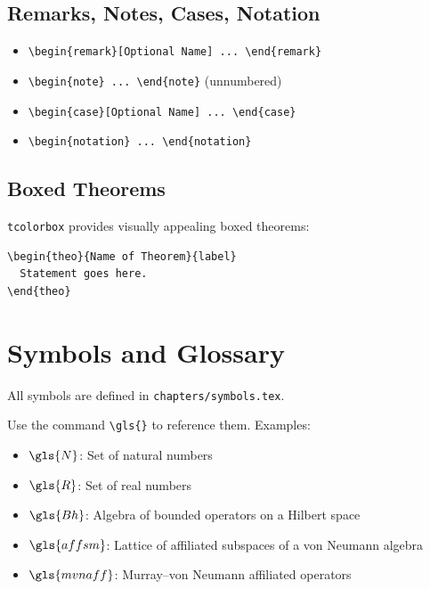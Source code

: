 \subsection*{Remarks, Notes, Cases, Notation}
\begin{itemize}
    \item \verb|\begin{remark}[Optional Name] ... \end{remark}|
    \item \verb|\begin{note} ... \end{note}| (unnumbered)
    \item \verb|\begin{case}[Optional Name] ... \end{case}|
    \item \verb|\begin{notation} ... \end{notation}|
\end{itemize}

\subsection*{Boxed Theorems}
\verb|tcolorbox| provides visually appealing boxed theorems:
\begin{verbatim}
\begin{theo}{Name of Theorem}{label}
  Statement goes here.
\end{theo}
\end{verbatim}

\section{Symbols and Glossary}
All symbols are defined in \verb|chapters/symbols.tex|.  

Use the command \verb|\gls{}| to reference them. Examples:

\begin{itemize}
    \item $\gls{N}$: Set of natural numbers  
    \item $\gls{R}$: Set of real numbers  
    \item $\gls{Bh}$: Algebra of bounded operators on a Hilbert space  
    \item $\gls{affsm}$: Lattice of affiliated subspaces of a von Neumann algebra  
    \item $\gls{mvnaff}$: Murray–von Neumann affiliated operators  
\end{itemize}

